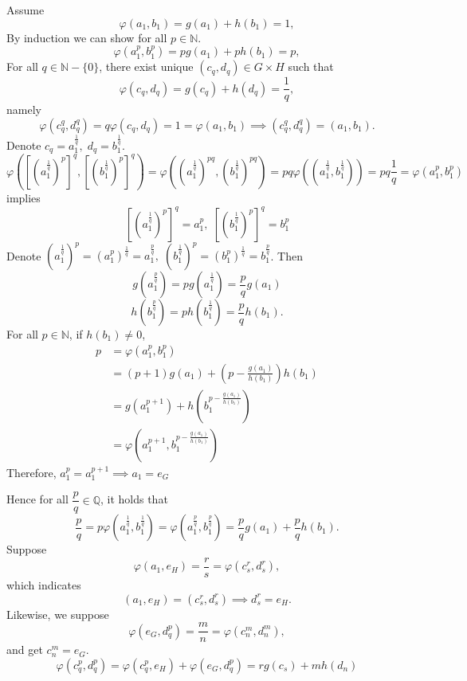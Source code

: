 \documentclass[12pt,letterpaper,boxed]{hmcpset}
\begin{document}
\newpage
\newpage
\newpage
 Assume
\[
\varphi(a_1,b_1)=g(a_1)+h(b_1)=1,
\]
By induction we can show for all $p\in\mathbb{N}$.
\[
\varphi(a_1^p,b_1^p)=pg(a_1)+ph(b_1)=p,
\]
For all $q\in\mathbb{N}-\{0\}$, there exist unique $(c_q,d_q)\in G\times H$ such that
\[
\varphi(c_q,d_q)=g(c_q)+h(d_q)=\frac{1}{q},
\]
namely
\[
\varphi(c_q^q,d_q^q)=q\varphi(c_q,d_q)=1=\varphi(a_1,b_1)\implies (c_q^q,d_q^q)=(a_1,b_1).
\]
Denote $c_q=a_1^{\frac{1}{q}},\;d_q=b_1^{\frac{1}{q}}$. 
\[
\varphi([(a_1^{\frac{1}{q}})^p]^q,[(b_1^{\frac{1}{q}})^p]^q)=\varphi((a_1^{\frac{1}{q}})^{pq},(b_1^{\frac{1}{q}})^{pq})=pq\varphi((a_1^{\frac{1}{q}},b_1^{\frac{1}{q}}))=pq\frac{1}{q}=\varphi(a_1^p,b_1^p)
\]
implies
\[
[(a_1^{\frac{1}{q}})^p]^q=a_1^p,\;[(b_1^{\frac{1}{q}})^p]^q=b_1^p
\]
Denote $(a_1^{\frac{1}{q}})^p=(a_1^p)^{\frac{1}{q}}=a_1^{\frac{p}{q}},\;(b_1^{\frac{1}{q}})^p=(b_1^p)^{\frac{1}{q}}=b_1^{\frac{p}{q}}$. 
Then 
\[
g(a_1^{\frac{p}{q}})=pg(a_1^{\frac{1}{q}})=\frac{p}{q}g(a_1)
\]
\[
h(b_1^{\frac{p}{q}})=ph(b_1^{\frac{1}{q}})=\frac{p}{q}h(b_1).
\] 
For all $p\in \mathbb{N}$, if $h(b_1)\ne 0$,   
\[
\begin{aligned}
p&=\varphi\left(a_1^p,b_1^p\right)\\
&=(p+1)g(a_1)+\left(p-\frac{g(a_1)}{h(b_1)}\right)h(b_1)\\
&=g(a_1^{p+1})+h\left(b_1^{p-\frac{g(a_1)}{h(b_1)}}\right)\\
&=\varphi\left(a_1^{p+1},b_1^{p-\frac{g(a_1)}{h(b_1)}}\right)
\end{aligned}
\]
Therefore, $a_1^p=a_1^{p+1}\implies a_1=e_G$





Hence for all $\dfrac{p}{q}\in\mathbb{Q}$, it holds that
\[
\frac{p}{q}=p\varphi(a_1^{\frac{1}{q}},b_1^{\frac{1}{q}})=\varphi(a_1^{\frac{p}{q}},b_1^{\frac{p}{q}})=\frac{p}{q}g(a_1)+\frac{p}{q}h(b_1).
\]
Suppose
\[
\varphi(a_1,e_H)=\dfrac{r}{s}=\varphi(c_{s}^{r},d_{s}^{r}),
\]
which indicates
\[
(a_1,e_H)=(c_{s}^{r},d_{s}^{r})\implies d_{s}^{r}=e_H.
\]
Likewise, we suppose 
\[
\varphi(e_G,d_q^p)=\dfrac{m}{n}=\varphi(c_{n}^{m},d_{n}^{m}),
\]
and get $c_{n}^{m}=e_G$.
\[
\varphi(c_q^p,d_q^p)=\varphi(c_q^p,e_H)+\varphi(e_G,d_q^p)=rg(c_s)+mh(d_n)
\]
\end{document}
